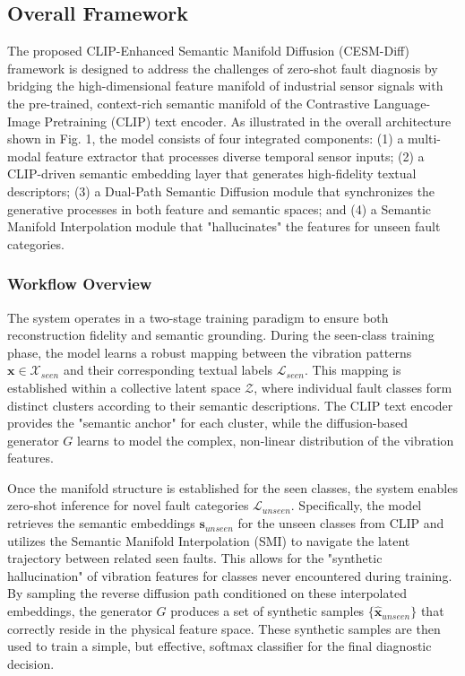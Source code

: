 \subsection{Overall Framework}
\label{sec:framework}

The proposed CLIP-Enhanced Semantic Manifold Diffusion (CESM-Diff) framework is designed to address the challenges of zero-shot fault diagnosis by bridging the high-dimensional feature manifold of industrial sensor signals with the pre-trained, context-rich semantic manifold of the Contrastive Language-Image Pretraining (CLIP) text encoder. As illustrated in the overall architecture shown in Fig. 1, the model consists of four integrated components: (1) a multi-modal feature extractor that processes diverse temporal sensor inputs; (2) a CLIP-driven semantic embedding layer that generates high-fidelity textual descriptors; (3) a Dual-Path Semantic Diffusion module that synchronizes the generative processes in both feature and semantic spaces; and (4) a Semantic Manifold Interpolation module that "hallucinates" the features for unseen fault categories.

\subsubsection{Workflow Overview}
The system operates in a two-stage training paradigm to ensure both reconstruction fidelity and semantic grounding. During the seen-class training phase, the model learns a robust mapping between the vibration patterns $\mathbf{x} \in \mathcal{X}_{seen}$ and their corresponding textual labels $\mathcal{L}_{seen}$. This mapping is established within a collective latent space $\mathcal{Z}$, where individual fault classes form distinct clusters according to their semantic descriptions. The CLIP text encoder provides the "semantic anchor" for each cluster, while the diffusion-based generator $G$ learns to model the complex, non-linear distribution of the vibration features.

Once the manifold structure is established for the seen classes, the system enables zero-shot inference for novel fault categories $\mathcal{L}_{unseen}$. Specifically, the model retrieves the semantic embeddings $\mathbf{s}_{unseen}$ for the unseen classes from CLIP and utilizes the Semantic Manifold Interpolation (SMI) to navigate the latent trajectory between related seen faults. This allows for the "synthetic hallucination" of vibration features for classes never encountered during training. By sampling the reverse diffusion path conditioned on these interpolated embeddings, the generator $G$ produces a set of synthetic samples $\{\hat{\mathbf{x}}_{unseen}\}$ that correctly reside in the physical feature space. These synthetic samples are then used to train a simple, but effective, softmax classifier for the final diagnostic decision.

